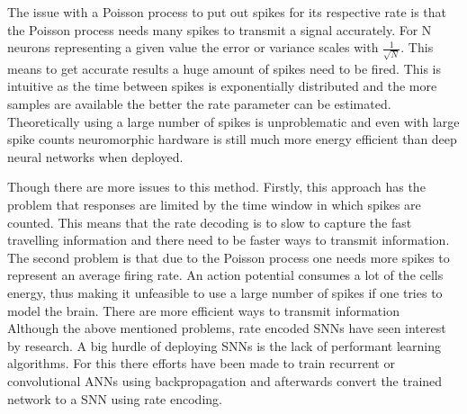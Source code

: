 The issue with a Poisson process to put out spikes for its respective rate is that the Poisson process needs many spikes to transmit a signal accurately. For N neurons representing a given value the error or variance scales with $\frac{1}{\sqrt{N}}$\cite{boerlin_predictive_2013}. This means to get accurate results a huge amount of spikes need to be fired. This is intuitive as the time between spikes is exponentially distributed and the more samples are available the better the rate parameter can be estimated.
Theoretically using a large number of spikes is unproblematic and even with large spike counts neuromorphic hardware is still much more energy efficient than deep neural networks when deployed\cite{indiveri_importance_2019}.


Though there are more issues to this method. Firstly, this approach has the problem that responses are limited by the time window in which spikes are counted\cite{andrew_spiking_2003}. This means that the rate decoding is to slow to capture the fast travelling information\cite{guo_neural_2021} and there need to be faster ways to transmit information.
The second problem is that due to the Poisson process one needs more spikes to represent an average firing rate. An action potential consumes a lot of the cells energy\cite{attwell_energy_2001}, thus making it unfeasible to use a large number of spikes if one tries to model the brain. There are more efficient ways to transmit information\\

Although the above mentioned problems, rate encoded \acp{SNN} have seen interest by research. A big hurdle of deploying \acp{SNN} is the lack of performant learning algorithms. For this there efforts have been made to train recurrent or convolutional \acp{ANN} using backpropagation and afterwards convert the trained network to a \ac{SNN}\cite{pfeiffer_deep_2018} using rate encoding\cite{diehl_conversion_2016}\cite{diehl_fast-classifying_2015}.
